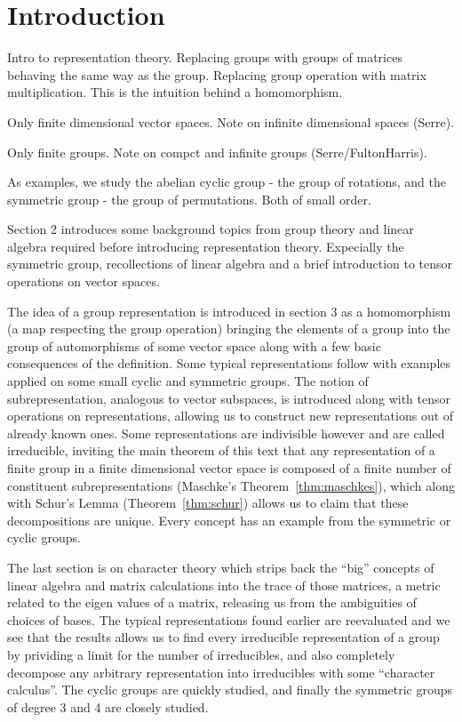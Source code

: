 \clearpage{\thispagestyle{empty}}
\section{Introduction}

	Intro to representation theory.
	Replacing groups with groups of matrices behaving the same way as the group. Replacing group operation with matrix multiplication. This is the intuition behind a homomorphism.
	
	Only finite dimensional vector spaces. Note on infinite dimensional spaces (Serre).
	
	Only finite groups. Note on compct and infinite groups (Serre/FultonHarris).
	
	As examples, we study the abelian cyclic group - the group of rotations, and the symmetric group - the group of permutations. Both of small order.
	
	Section 2 introduces some background topics from group theory and linear algebra required before introducing representation theory. Expecially the symmetric group,  recollections of linear algebra and a brief introduction to tensor operations on vector spaces.
	
	The idea of a group representation is introduced in section 3 as a homomorphism (a map respecting the group operation) bringing the elements of a group into the group of automorphisms of some vector space along with a few basic consequences of the definition. Some typical representations follow with examples applied on some small cyclic and symmetric groups. The notion of subrepresentation, analogous to vector subspaces, is introduced along with tensor operations on representations, allowing us to construct new representations out of already known ones. Some representations are indivisible however and are called irreducible, inviting the main theorem of this text that any representation of a finite group in a finite dimensional vector space is composed of a finite number of constituent subrepresentations (Maschke's Theorem~\ref{thm:maschkes}), which along with Schur's Lemma (Theorem~\ref{thm:schur})  allows us to claim that these decompositions are unique. Every concept has an example from the symmetric or cyclic groups.
	
	The last section is on character theory which strips back the ``big'' concepts of linear algebra and matrix calculations into the trace of those matrices, a metric related to the eigen values of a matrix, releasing us from the ambiguities of choices of bases. The typical representations found earlier are reevaluated and we see that the results allows us to find every irreducible representation of a group by prividing a limit for the number of irreducibles, and also completely decompose any arbitrary representation into irreducibles with some ``character calculus''. The cyclic groups are quickly studied, and finally the symmetric groups of degree 3 and 4 are closely studied.